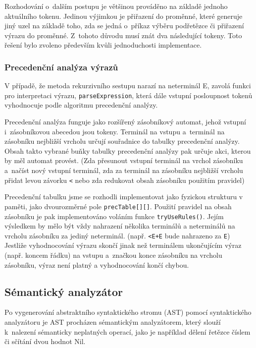 \documentclass[12pt,a4paper,titlepage,final]{article}
\begin{document}
Rozhodování o~dalším postupu je většinou prováděno na základě jednoho 
aktuálního tokenu. Jedinou výjimkou je přiřazení do proměnné, které 
generuje jiný uzel na základě toho, zda se jedná o~příkaz výběru podřetězce 
či přiřazení výrazu do proměnné. Z~tohoto důvodu musí znát dva následující 
tokeny. Toto řešení bylo zvoleno především kvůli jednoduchosti implementace.

\subsubsection{Precedenční analýza výrazů}
V případě, že metoda rekurzivního sestupu narazí na neterminál E, zavolá funkci 
pro interpretaci výrazu, \texttt{parseExpression}, která dále vstupní posloupnost 
tokenů vyhodnocuje podle algoritmu precedenční analýzy.

Precedenční analýza funguje jako rozšířený zásobníkový automat, jehož vstupní 
i~zá\-so\-bní\-ko\-vou abecedou jsou tokeny. Terminál na vstupu a~terminál na zásobníku 
nejbližší vrcholu určují souřadnice do tabulky precedenční analýzy. 
Obsah takto vybrané buňky tabulky precedenční analýzy pak určuje akci, kterou 
by měl automat provést. (Zda přesunout vstupní terminál na vrchol zásobníku a~načíst 
nový vstupní terminál, zda za terminál na zásobníku nejbližší vrcholu přidat 
levou závorku \texttt{<} nebo zda redukovat obsah zásobníku použitím pravidel)

Precedenční tabulku jsme se rozhodli implementovat jako fyzickou strukturu v paměti, 
jako dvourozměrné pole \texttt{precTable[][]}. Použití pravidel na obsah zásobníku je 
pak implementováno voláním funkce \texttt{tryUseRules()}. Jejím výsledkem by mělo být 
vždy nahrazení několika terminálů a neterminálů na vrcholu zásobníku za jediný 
neterminál. (např. \texttt{<E+E} bude nahrazeno za \texttt{E}) Jestliže vyhodnocování 
výrazu skončí jinak než terminálem ukončujícím výraz (např. koncem řádku) na vstupu 
a~značkou konce zásobníku na vrcholu zásobníku, výraz není platný a vyhodnocování 
končí chybou.
\subsection{Sémantický analyzátor}
Po vygenerování abstraktního syntaktického stromu (AST) pomocí syntaktického analyzátoru 
je AST procházen sémantickým analyzátorem, který slouží k~nalezení sémanticky 
neplatných operací, jako je například dělení řetězce číslem či sčítání dvou hodnot Nil.
\end{document}
